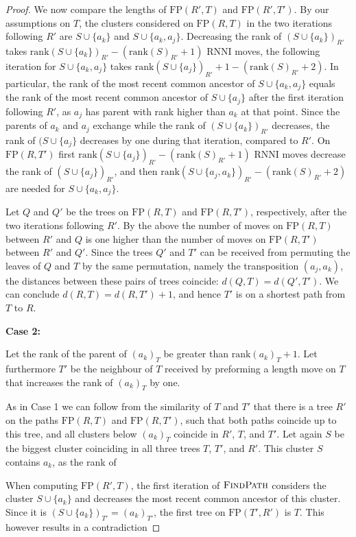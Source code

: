 \documentclass[11pt]{amsart}
\newcommand{\rnni}{\mathrm{RNNI}}
\newcommand{\findpath}{\textsc{FindPath}}
\newcommand{\rank}{\mathrm{rank}}
\newcommand{\fp}{\mathrm{FP}}
\begin{document}
\begin{proof}
	We now compare the lengths of $\fp(R',T)$ and $\fp(R',T')$.
	By our assumptions on $T$, the clusters considered on $\fp(R,T)$ in the two iterations following $R'$ are $S \cup \{a_k\}$ and $S \cup \{a_k, a_j\}$.
	Decreasing the rank of $(S \cup \{a_k\})_{R'}$ takes $\rank(S \cup \{a_k\})_{R'} - (\rank(S)_{R'} + 1)$ $\rnni$ moves, the following iteration for $S \cup \{a_k, a_j\}$ takes $\rank(S \cup \{a_j\})_{R'} + 1 - (\rank(S)_{R'} + 2)$.
	In particular, the rank of the most recent common ancestor of $S \cup \{a_k, a_j\}$ equals the rank of the most recent common ancestor of $S \cup \{a_j\}$ after the first iteration following $R'$, as $a_j$ has parent with rank higher than $a_k$ at that point.
	Since the parents of $a_k$ and $a_j$ exchange while the rank of $(S \cup \{a_k\})_{R'}$ decreases, the rank of $(S \cup \{a_j\}$ decreases by one during that iteration, compared to $R'$.
	On $\fp(R,T')$ first $\rank(S \cup \{a_j\})_{R'} - (\rank(S)_{R'} + 1)$ $\rnni$ moves decrease the rank of $(S \cup \{a_j\})_{R'}$, and then $\rank(S \cup \{a_j, a_k\})_{R'} - (\rank(S)_{R'} + 2)$ are needed for $S \cup \{a_k, a_j\}$.

	Let $Q$ and $Q'$ be the trees on $\fp(R,T)$ and $\fp(R,T')$, respectively, after the two iterations following $R'$.
	By the above the number of moves on $\fp(R,T)$ between $R'$ and $Q$ is one higher than the number of moves on $\fp(R,T')$ between $R'$ and $Q'$.
	Since the trees $Q'$ and $T'$ can be received from permuting the leaves of $Q$ and $T$ by the same permutation, namely the transposition $(a_j, a_k)$, the distances between these pairs of trees coincide: $d(Q,T) = d(Q',T')$.
	We can conclude $d(R,T) = d(R,T') + 1$, and hence $T'$ is on a shortest path from $T$ to $R$.

	\textbf{Case 2:}

	Let the rank of the parent of $(a_k)_T$ be greater than $\rank(a_k)_T + 1$.
	Let furthermore $T'$ be the neighbour of $T$ received by preforming a length move on $T$ that increases the rank of $(a_k)_T$ by one.

	As in Case 1 we can follow from the similarity of $T$ and $T'$ that there is a tree $R'$ on the paths $\fp(R,T)$ and $\fp(R,T')$, such that both paths coincide up to this tree, and all clusters below $(a_k)_T$ coincide in $R'$, $T$, and $T'$.
	Let again $S$ be the biggest cluster coinciding in all three trees $T$, $T'$, and $R'$.
	This cluster $S$ contains $a_k$, as the rank of

	When computing $\fp(R',T)$, the first iteration of $\findpath$ considers the cluster $S \cup \{a_k\}$ and decreases the most recent common ancestor of this cluster.
	Since it is $(S\cup\{a_k\})_{T'} = (a_k)_{T'}$, the first tree on $\fp(T',R')$ is $T$.
	This however results in a contradiction
\end{proof}
\end{document}
